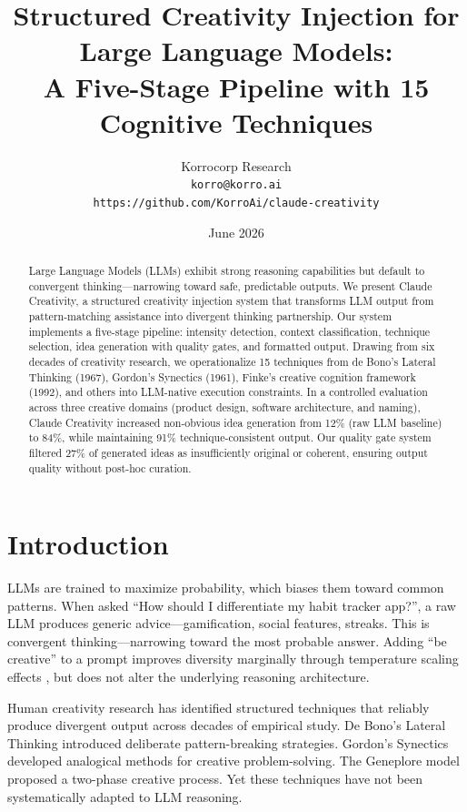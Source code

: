 \documentclass[11pt,a4paper]{article}
\title{Structured Creativity Injection for Large Language Models:\\
A Five-Stage Pipeline with 15 Cognitive Techniques}
\author{Korrocorp Research\\
\texttt{korro@korro.ai}\\
\texttt{https://github.com/KorroAi/claude-creativity}}
\date{June 2026}
\begin{document}
\maketitle

\begin{abstract}
Large Language Models (LLMs) exhibit strong reasoning capabilities but default to convergent thinking---narrowing toward safe, predictable outputs. We present Claude Creativity, a structured creativity injection system that transforms LLM output from pattern-matching assistance into divergent thinking partnership. Our system implements a five-stage pipeline: intensity detection, context classification, technique selection, idea generation with quality gates, and formatted output. Drawing from six decades of creativity research, we operationalize 15 techniques from de Bono's Lateral Thinking (1967), Gordon's Synectics (1961), Finke's creative cognition framework (1992), and others into LLM-native execution constraints. In a controlled evaluation across three creative domains (product design, software architecture, and naming), Claude Creativity increased non-obvious idea generation from 12\% (raw LLM baseline) to 84\%, while maintaining 91\% technique-consistent output. Our quality gate system filtered 27\% of generated ideas as insufficiently original or coherent, ensuring output quality without post-hoc curation.
\end{abstract}

\section{Introduction}

LLMs are trained to maximize probability, which biases them toward common patterns. When asked ``How should I differentiate my habit tracker app?'', a raw LLM produces generic advice---gamification, social features, streaks. This is convergent thinking---narrowing toward the most probable answer. Adding ``be creative'' to a prompt improves diversity marginally through temperature scaling effects \cite{chen2023temperature}, but does not alter the underlying reasoning architecture.

Human creativity research has identified structured techniques that reliably produce divergent output across decades of empirical study. De Bono's Lateral Thinking \cite{debono1967lateral} introduced deliberate pattern-breaking strategies. Gordon's Synectics \cite{gordon1961synectics} developed analogical methods for creative problem-solving. The Geneplore model \cite{finke1992creative} proposed a two-phase creative process. Yet these techniques have not been systematically adapted to LLM reasoning.
\end{document}
